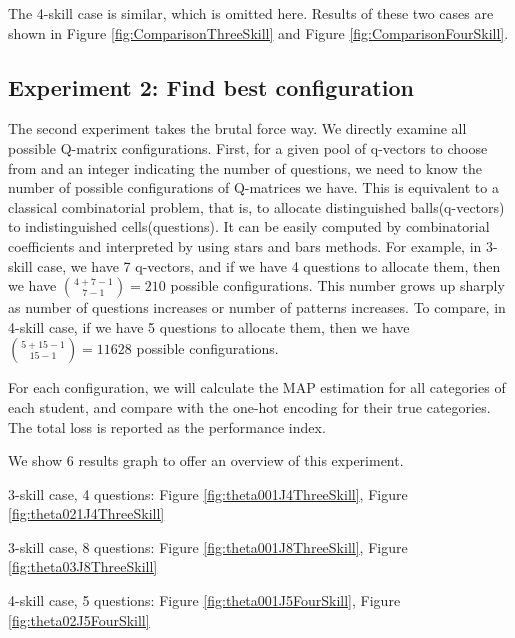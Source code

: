 \documentclass{edm_template}
\begin{document}
The 4-skill case is similar, which is omitted here. Results of these two cases are shown in Figure  \ref{fig:ComparisonThreeSkill} and Figure \ref{fig:ComparisonFourSkill}.

\subsection{Experiment 2: Find best configuration}
The second experiment takes the brutal force way. We directly examine all possible Q-matrix configurations. First, for a given pool of q-vectors to choose from and an integer indicating the number of questions, we need to know the number of possible configurations of Q-matrices we have. This is equivalent to a classical combinatorial problem, that is, to allocate distinguished balls(q-vectors) to indistinguished cells(questions). It can be easily computed by combinatorial coefficients and interpreted by using stars and bars methods. For example, in 3-skill case, we have 7 q-vectors, and if we have 4 questions to allocate them, then we have ${{4+7-1}\choose {7-1}}=210$ possible configurations. This number grows up sharply as number of questions increases or number of patterns increases. To compare, in 4-skill case, if we have 5 questions to allocate them, then we have ${{5+15-1}\choose {15-1}}=11628$ possible configurations. 

For each configuration, we will calculate the MAP estimation for all categories of each student, and compare with the one-hot encoding for their true categories. The total loss is reported as the performance index.

We show 6 results graph to offer an overview of this experiment.

3-skill case, 4 questions: Figure \ref{fig:theta001J4ThreeSkill}, Figure \ref{fig:theta021J4ThreeSkill}

3-skill case, 8 questions: Figure \ref{fig:theta001J8ThreeSkill}, Figure \ref{fig:theta03J8ThreeSkill}

4-skill case, 5 questions: Figure \ref{fig:theta001J5FourSkill}, Figure \ref{fig:theta02J5FourSkill}
\end{document}
